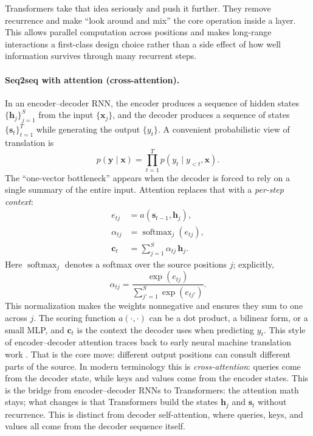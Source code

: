 Transformers \citep{Vaswani2017} take that idea seriously and push it further. They remove recurrence and make ``look around and mix'' the core operation inside a layer. This allows parallel computation across positions and makes long-range interactions a first-class design choice rather than a side effect of how well information survives through many recurrent steps.

\paragraph{Seq2seq with attention (cross-attention).}
In an encoder--decoder RNN, the encoder produces a sequence of hidden states \(\{\mathbf{h}_j\}_{j=1}^{S}\) from the input \(\{\mathbf{x}_j\}\), and the decoder produces a sequence of states \(\{\mathbf{s}_t\}_{t=1}^{T}\) while generating the output \(\{y_t\}\). A convenient probabilistic view of translation is
\begin{equation}
    p(\mathbf{y}\mid \mathbf{x})
    = \prod_{t=1}^{T} p\!\left(y_t \mid y_{<t}, \mathbf{x}\right).
    \label{eq:transformers_seq2seq_factorization}
\end{equation}
The ``one-vector bottleneck'' appears when the decoder is forced to rely on a single summary of the entire input. Attention replaces that with a \emph{per-step context}:
\begin{equation}
\begin{split}
    e_{t j} &= a(\mathbf{s}_{t-1}, \mathbf{h}_j),\\
    \alpha_{t j} &= \operatorname{softmax}_j(e_{t j}),\\
    \mathbf{c}_t &= \sum_{j=1}^{S} \alpha_{t j}\,\mathbf{h}_j.
\end{split}
\label{eq:transformers_context_seq2seq}
\end{equation}
Here \(\operatorname{softmax}_j\) denotes a softmax over the source positions \(j\); explicitly,
\[
\alpha_{t j}=\frac{\exp(e_{t j})}{\sum_{j'=1}^{S}\exp(e_{t j'})}.
\]
This normalization makes the weights nonnegative and ensures they sum to one across \(j\).
The scoring function \(a(\cdot,\cdot)\) can be a dot product, a bilinear form, or a small MLP, and
\(\mathbf{c}_t\) is the context the decoder uses when predicting \(y_t\).
This style of encoder--decoder attention traces back to early neural machine translation work
\citep{Bahdanau2015}.
That is the core move: different output positions can consult different parts of the source. In modern terminology this is \emph{cross-attention}: queries come from the decoder state, while keys and values come from the encoder states.
This is the bridge from encoder--decoder RNNs to Transformers: the attention math stays; what changes is
that Transformers build the states \(\mathbf{h}_j\) and \(\mathbf{s}_t\) without recurrence. This is distinct from decoder self-attention, where queries, keys, and values all come from the decoder sequence itself.

